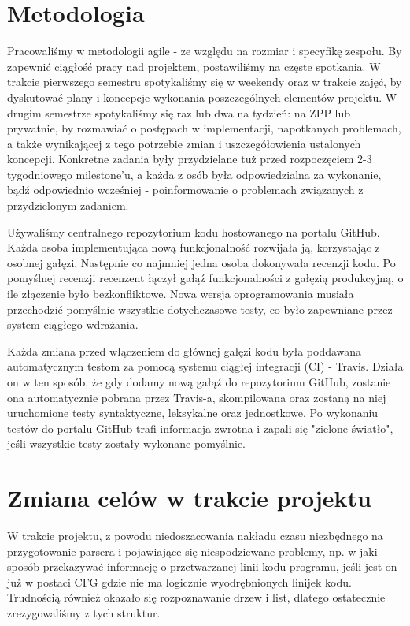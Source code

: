 \documentclass[a4paper,twoside,openright,11pt]{report}
\begin{document}
  \section {Metodologia}
\par Pracowaliśmy w metodologii agile - ze względu na rozmiar i specyfikę zespołu. By zapewnić ciągłość pracy nad projektem, postawiliśmy na częste spotkania. W trakcie pierwszego semestru spotykaliśmy się w weekendy oraz w trakcie zajęć, by dyskutować plany i koncepcje wykonania poszczególnych elementów projektu. W drugim semestrze spotykaliśmy się raz lub dwa na tydzień: na ZPP lub prywatnie, by rozmawiać o postępach w implementacji, napotkanych problemach, a także wynikającej z tego potrzebie zmian i uszczegółowienia ustalonych koncepcji. Konkretne zadania były przydzielane tuż przed rozpoczęciem 2-3 tygodniowego milestone’u, a każda z osób była odpowiedzialna za wykonanie, bądź odpowiednio wcześniej - poinformowanie o problemach związanych z przydzielonym zadaniem.
\par Używaliśmy centralnego repozytorium kodu hostowanego na portalu GitHub. Każda osoba implementująca nową funkcjonalność rozwijała ją, korzystając z osobnej gałęzi. Następnie co najmniej jedna osoba dokonywała recenzji kodu. Po pomyślnej recenzji recenzent łączył gałąź funkcjonalności z gałęzią produkcyjną, o ile złączenie było bezkonfliktowe. Nowa wersja oprogramowania musiała przechodzić pomyślnie wszystkie dotychczasowe testy, co było zapewniane przez system ciągłego wdrażania. 
\par Każda zmiana przed włączeniem do głównej gałęzi kodu była poddawana automatycznym testom za pomocą systemu ciągłej integracji (CI) - Travis. Działa on w ten sposób, że gdy dodamy nową gałąź do repozytorium GitHub, zostanie ona automatycznie pobrana przez Travis-a, skompilowana oraz zostaną na niej uruchomione testy syntaktyczne, leksykalne oraz jednostkowe. Po wykonaniu testów do portalu GitHub trafi informacja zwrotna i zapali się "zielone światło", jeśli wszystkie testy zostały wykonane pomyślnie. 

  \section {Zmiana celów w trakcie projektu}
\par W trakcie projektu, z powodu niedoszacowania nakładu czasu niezbędnego na przygotowanie parsera i pojawiające się niespodziewane problemy, np. w jaki sposób przekazywać informację o przetwarzanej linii kodu programu, jeśli jest on już w postaci CFG gdzie nie ma logicznie wyodrębnionych linijek kodu. Trudnością również okazało się rozpoznawanie drzew i list, dlatego ostatecznie zrezygowaliśmy z tych struktur.
\end{document}
